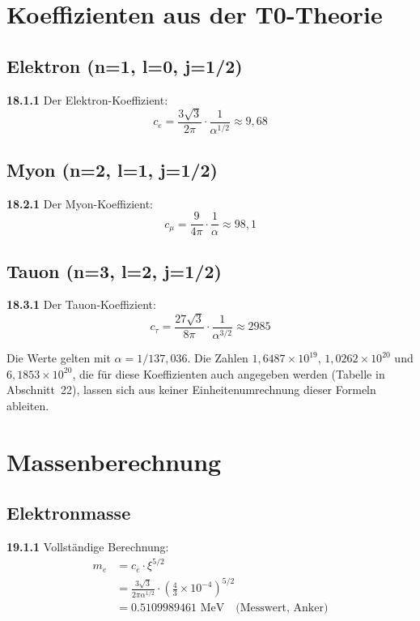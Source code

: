 \section{Koeffizienten aus der T0-Theorie}

\subsection{Elektron (n=1, l=0, j=1/2)}
\noindent \textbf{18.1.1} Der Elektron-Koeffizient:
\begin{equation}
	c_e = \frac{3\sqrt{3}}{2\pi} \cdot \frac{1}{\alpha^{1/2}} \approx 9{,}68
\end{equation}

\subsection{Myon (n=2, l=1, j=1/2)}
\noindent \textbf{18.2.1} Der Myon-Koeffizient:
\begin{equation}
	c_\mu = \frac{9}{4\pi} \cdot \frac{1}{\alpha} \approx 98{,}1
\end{equation}

\subsection{Tauon (n=3, l=2, j=1/2)}
\noindent \textbf{18.3.1} Der Tauon-Koeffizient:
\begin{equation}
	c_\tau = \frac{27\sqrt{3}}{8\pi} \cdot \frac{1}{\alpha^{3/2}} \approx 2985
\end{equation}

Die Werte gelten mit $\alpha = 1/137{,}036$. Die Zahlen $1{,}6487\times10^{19}$, $1{,}0262\times10^{20}$ und $6{,}1853\times10^{20}$, die für diese Koeffizienten auch angegeben werden (Tabelle in Abschnitt~22), lassen sich aus keiner Einheitenumrechnung dieser Formeln ableiten.

\section{Massenberechnung}

\subsection{Elektronmasse}
\noindent \textbf{19.1.1} Vollständige Berechnung:
\begin{align}
	m_e &= c_e \cdot \xi^{5/2} \\
	&= \frac{3\sqrt{3}}{2\pi\alpha^{1/2}} \cdot \left(\frac{4}{3} \times 10^{-4}\right)^{5/2} \\
	&= 0.5109989461 \text{ MeV} \quad \text{(Messwert, Anker)}
\end{align}

